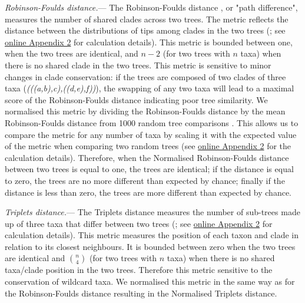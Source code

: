 \documentclass[12pt,letterpaper]{article}
\renewcommand{\subsubsection}[1]{%
\vspace{2ex}
\noindent
\textit{#1.}---}
\begin{document}
\subsubsection{Robinson-Foulds distance}
The Robinson-Foulds distance \citep{RF1981}, or "path difference", measures the number of shared clades across two trees. The metric reflects the distance between the distributions of tips among clades in the two trees (\citealt{RF1981}; see \hyperref[SupplementaryMaterial]{online Appendix 2} for calculation details). This metric is bounded between one, when the two trees are identical, and $n-2$ (for two trees with $n$ taxa) when there is no shared clade in the two trees. This metric is sensitive to minor changes in clade conservation: if the trees are composed of two clades of three taxa (\textit{(((a,b),c),((d,e),f))}), the swapping of any two taxa will lead to a maximal score of the Robinson-Foulds distance indicating poor tree similarity. We normalised this metric by dividing the Robinson-Foulds distance by the mean Robinson-Foulds distance from 1000 random tree comparisons \citep{Bogdanowicz2012}. This allows us to compare the metric for any number of taxa by scaling it with the expected value of the metric when comparing two random trees (see \hyperref[SupplementaryMaterial]{online Appendix 2} for the calculation details). Therefore, when the Normalised Robinson-Foulds distance between two trees is equal to one, the trees are identical; if the distance is equal to zero, the trees are no more different than expected by chance; finally if the distance is less than zero, the trees are more different than expected by chance.

\subsubsection{Triplets distance}
The Triplets distance \citep{dobson1975triplets} measures the number of sub-trees made up of three taxa that differ between two trees (\citealt{critchlowthe1996}; see \hyperref[SupplementaryMaterial]{online Appendix 2} for calculation details). This metric measures the position of each taxon and clade in relation to its closest neighbours. It is bounded between zero when the two trees are identical and $\binom{n}{4}$ (for two trees with $n$ taxa) when there is no shared taxa/clade position in the two trees. Therefore this metric sensitive to the conservation of wildcard taxa. We normalised this metric in the same way as for the Robinson-Foulds distance resulting in the Normalised Triplets distance.
\end{document}
